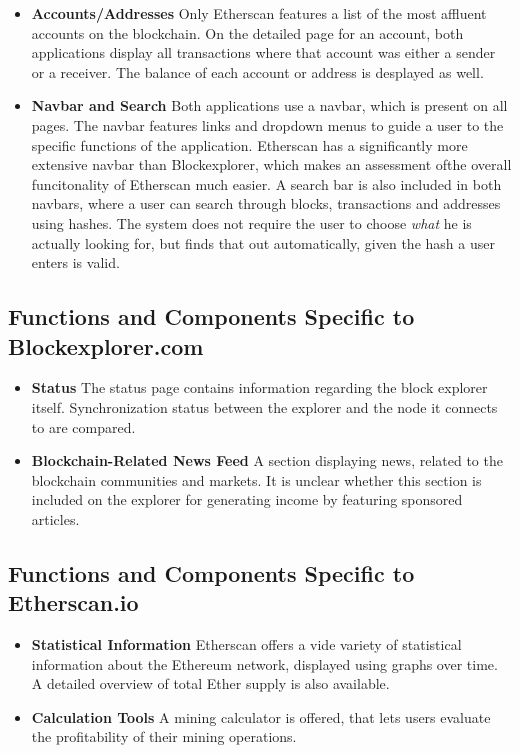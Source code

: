 \begin{itemize}
\item \textbf{Accounts/Addresses}
Only Etherscan features a list of the most affluent accounts on the blockchain. On the detailed page for an account, both applications display all transactions where that account was either a sender or a receiver. The balance of each account or address is desplayed as well.
\item \textbf{Navbar and Search}
Both applications use a navbar, which is present on all pages. The navbar features links and dropdown menus to guide a user to the specific functions of the application. Etherscan has a significantly more extensive navbar than Blockexplorer, which makes an assessment ofthe overall funcitonality of Etherscan much easier. A search bar is also included in both navbars, where a user can search through blocks, transactions and addresses using hashes. The system does not require the user to choose \emph{what} he is actually looking for, but finds that out automatically, given the hash a user enters is valid.
\end{itemize}

\subsection{Functions and Components Specific to Blockexplorer.com}

\begin{itemize}
\item \textbf{Status}
The status page contains information regarding the block explorer itself. Synchronization status between the explorer and the node it connects to are compared.
\item \textbf{Blockchain-Related News Feed}
A section displaying news, related to the blockchain communities and markets. It is unclear whether this section is included on the explorer for generating income by featuring sponsored articles.
\end{itemize}

\subsection{Functions and Components Specific to Etherscan.io}

\begin{itemize}
\item \textbf{Statistical Information}
Etherscan offers a vide variety of statistical information about the Ethereum network, displayed using graphs over time. A detailed overview of total Ether supply is also available.
\item \textbf{Calculation Tools}
A mining calculator is offered, that lets users evaluate the profitability of their mining operations. 
\end{itemize}

